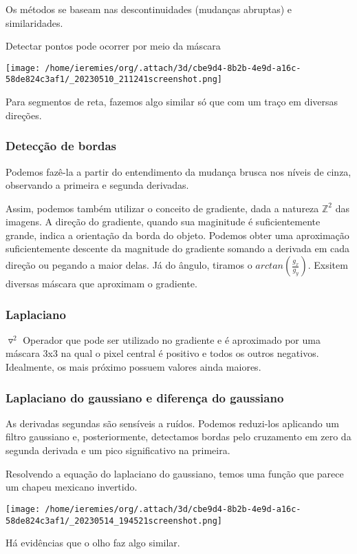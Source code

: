 \documentclass[twocolumn, 10pt]{article}
\begin{document}
Os métodos se baseam nas descontinuidades (mudanças abruptas) e similaridades.

Detectar pontos pode ocorrer por meio da máscara
\begin{center}
\texttt{[image: /home/ieremies/org/.attach/3d/cbe9d4-8b2b-4e9d-a16c-58de824c3af1/\_20230510\_211241screenshot.png]}
\end{center}
Para segmentos de reta, fazemos algo similar só que com um traço em diversas direções.

\subsubsection*{Detecção de bordas}
\label{sec:org03e2dc9}
Podemos fazê-la a partir do entendimento da mudança brusca nos níveis de cinza, observando a primeira e segunda derivadas.

Assim, podemos também utilizar o conceito de gradiente, dada a natureza \(\mathbb{Z}^2\) das imagens.
A direção do gradiente, quando sua maginitude é suficientemente grande, indica a orientação da borda do objeto.
Podemos obter uma aproximação suficientemente descente da magnitude do gradiente somando a derivada em cada direção ou pegando a maior delas.
Já do ângulo, tiramos o \(arctan(\frac{g_x}{g_y})\).
Exsitem diversas máscara que aproximam o gradiente.

\subsubsection*{Laplaciano}
\label{sec:orgdb4db57}
\(\triangledown^2\)
Operador que pode ser utilizado no gradiente e é aproximado por uma máscara 3x3 na qual o pixel central é positivo e todos os outros negativos. Idealmente, os mais próximo possuem valores ainda maiores.

\subsubsection*{Laplaciano do gaussiano e diferença do gaussiano}
\label{sec:org620fefa}
As derivadas segundas são sensíveis a ruídos.
Podemos reduzi-los aplicando um filtro gaussiano e, posteriormente, detectamos bordas pelo cruzamento em zero da segunda derivada e um pico significativo na primeira.

Resolvendo a equação do laplaciano do gaussiano, temos uma função que parece um chapeu mexicano invertido.

\begin{center}
\texttt{[image: /home/ieremies/org/.attach/3d/cbe9d4-8b2b-4e9d-a16c-58de824c3af1/\_20230514\_194521screenshot.png]}
\end{center}
Há evidências que o olho faz algo similar.
\end{document}
